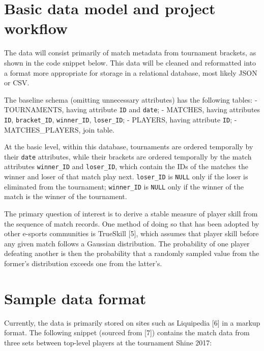 \hypertarget{basic-data-model-and-project-workflow}{%
\section{Basic data model and project
workflow}\label{basic-data-model-and-project-workflow}}

The data will consist primarily of match metadata from tournament
brackets, as shown in the code snippet below. This data will be cleaned
and reformatted into a format more appropriate for storage in a
relational database, most likely JSON or CSV.

The baseline schema (omitting unnecessary attributes) has the following
tables: - TOURNAMENTS, having attribute \texttt{ID} and \texttt{date}; -
MATCHES, having attributes \texttt{ID}, \texttt{bracket\_ID},
\texttt{winner\_ID}, \texttt{loser\_ID}; - PLAYERS, having attribute
\texttt{ID}; - MATCHES\_PLAYERS, join table.

At the basic level, within this database, tournaments are ordered
temporally by their \texttt{date} attributes, while their brackets are
ordered temporally by the match attributes \texttt{winner\_ID} and
\texttt{loser\_ID}, which contain the IDs of the matches the winner and
loser of that match play next. \texttt{loser\_ID} is \texttt{NULL} only
if the loser is eliminated from the tournament; \texttt{winner\_ID} is
\texttt{NULL} only if the winner of the match is the winner of the
tournament.

The primary question of interest is to derive a stable measure of player
skill from the sequence of match records. One method of doing so that
has been adopted by other e-sports communities is TrueSkill {[}5{]},
which assumes that player skill before any given match follows a
Gaussian distribution. The probability of one player defeating another
is then the probability that a randomly sampled value from the former's
distribution exceeds one from the latter's.

\hypertarget{sample-data-format}{%
\section{Sample data format}\label{sample-data-format}}

Currently, the data is primarily stored on sites such as Liquipedia
{[}6{]} in a markup format. The following snippet (sourced from {[}7{]})
contains the match data from three sets between top-level players at the
tournament Shine 2017:

